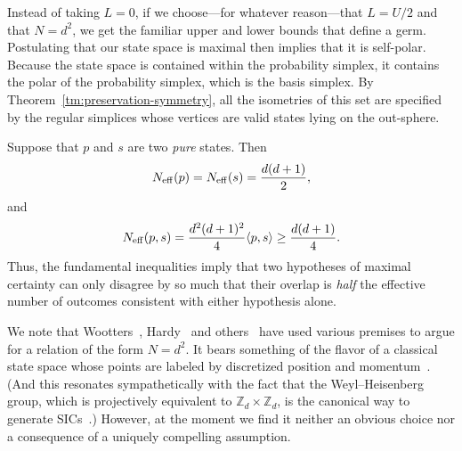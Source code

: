 \documentclass[aps,pra,superscriptaddress,10pt,tightenlines,twocolumn,nofootinbib]{revtex4}
\theoremstyle{remark}
\newcommand{\inprod}[2]{{\left\langle #1 , #2 \right\rangle}}
\begin{document}
Instead of taking $L = 0$, if we choose---for whatever reason---that $L = U/2$ and that $N = d^2$, we get the familiar upper and lower bounds that define a germ.  Postulating that our state space is maximal then implies that it is self-polar.  Because the state space is contained within the probability simplex, it contains the polar of the probability simplex, which is the basis simplex.  By Theorem~\ref{tm:preservation-symmetry}, all the isometries of this set are specified by the regular simplices whose vertices are valid states lying on the out-sphere.

Suppose that $p$ and $s$ are two \emph{pure} states.  Then
\begin{equation}
N_{\rm eff}(p) = N_{\rm eff}(s) = \frac{d(d+1)}{2},
\end{equation}
and
\begin{equation}
N_{\rm eff}(p,s) = \frac{d^2(d+1)^2}{4} \inprod{p}{s} \geq \frac{d(d+1)}{4}.
\end{equation}
Thus, the fundamental inequalities imply that two hypotheses of maximal certainty can only disagree by so much that their overlap is \emph{half} the effective number of outcomes consistent with either hypothesis alone.

We note that Wootters~\cite{Wootters86}, Hardy~\cite{Hardy01} and others~\cite{CFS2001} have used various premises to argue for a relation of the form $N = d^2$.  It bears something of the flavor of a classical state space whose points are labeled by discretized position and momentum~\cite{spekkens2014, Weyl27}.  (And this resonates sympathetically with the fact that the Weyl--Heisenberg group, which is projectively equivalent to $\mathbb{Z}_d \times \mathbb{Z}_d$, is the canonical way to generate SICs~\cite{Zhu10, appleby2016}.) However, at the moment we find it neither an obvious choice nor a consequence of a uniquely compelling assumption.
\end{document}
